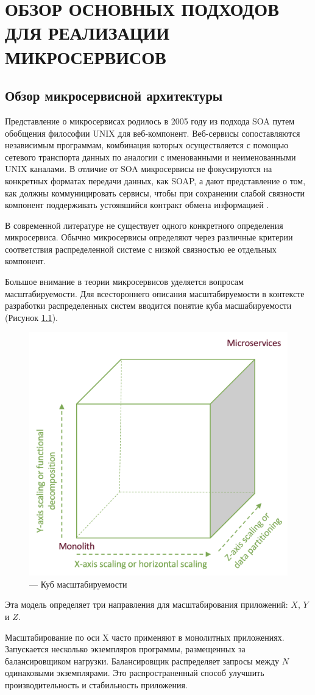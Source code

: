 \chapter{ОБЗОР ОСНОВНЫХ ПОДХОДОВ ДЛЯ РЕАЛИЗАЦИИ МИКРОСЕРВИСОВ}
\section{Обзор микросервисной архитектуры}

Представление о микросервисах родилось в 2005 году из подхода SOA путем обобщения философии UNIX для веб-компонент.
Веб-сервисы сопоставляются независимым программам, комбинация которых осуществляется с помощью сетевого транспорта данных по аналогии с именованными и неименованными UNIX каналами.
В отличие от SOA микросервисы не фокусируются на конкретных форматах передачи данных, как SOAP, 
а дают представление о том, как должны коммуницировать сервисы, чтобы при сохранении слабой связности компонент поддерживать устоявшийся контракт обмена информацией \cite{micro-1}.

В современной литературе не существует одного конкретного определения микросервиса. 
Обычно микросервисы определяют через различные критерии соответствия распределенной системе с низкой связностью ее отдельных компонент.

Большое внимание в теории микросервисов уделяется вопросам масштабируемости. 
Для всестороннего описания масштабируемости в контексте разработки распределенных систем вводится понятие куба масшабируемости \cite{scalability} (Рисунок \ref{fig:cube}).

\begin{figure}[H]
    \centering
    \includegraphics[width=0.4\linewidth]{img/cube.png}
    \caption{--- Куб масштабируемости}
    \label{fig:cube}
\end{figure}

Эта модель определяет три направления для масштабирования приложений: $X$, $Y$ и $Z$.

Масштабирование по оси X часто применяют в монолитных приложениях. 
Запускается несколько экземпляров программы, размещенных за балансировщиком нагрузки. 
Балансировщик распределяет запросы между $N$ одинаковыми экземплярами. 
Это распространенный способ улучшить
производительность и стабильность приложения.

